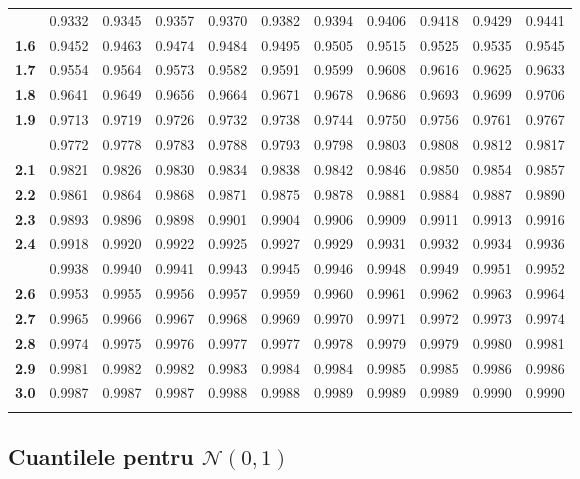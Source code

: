 \documentclass[]{article}
\begin{document}
\begin{longtable}{>{\bfseries}r|rrrrrrrrrr}
\addlinespace
1.5 & 0.9332 & 0.9345 & 0.9357 & 0.9370 & 0.9382 & 0.9394 & 0.9406 & 0.9418 & 0.9429 & 0.9441\\
1.6 & 0.9452 & 0.9463 & 0.9474 & 0.9484 & 0.9495 & 0.9505 & 0.9515 & 0.9525 & 0.9535 & 0.9545\\
1.7 & 0.9554 & 0.9564 & 0.9573 & 0.9582 & 0.9591 & 0.9599 & 0.9608 & 0.9616 & 0.9625 & 0.9633\\
1.8 & 0.9641 & 0.9649 & 0.9656 & 0.9664 & 0.9671 & 0.9678 & 0.9686 & 0.9693 & 0.9699 & 0.9706\\
1.9 & 0.9713 & 0.9719 & 0.9726 & 0.9732 & 0.9738 & 0.9744 & 0.9750 & 0.9756 & 0.9761 & 0.9767\\
\addlinespace
2.0 & 0.9772 & 0.9778 & 0.9783 & 0.9788 & 0.9793 & 0.9798 & 0.9803 & 0.9808 & 0.9812 & 0.9817\\
2.1 & 0.9821 & 0.9826 & 0.9830 & 0.9834 & 0.9838 & 0.9842 & 0.9846 & 0.9850 & 0.9854 & 0.9857\\
2.2 & 0.9861 & 0.9864 & 0.9868 & 0.9871 & 0.9875 & 0.9878 & 0.9881 & 0.9884 & 0.9887 & 0.9890\\
2.3 & 0.9893 & 0.9896 & 0.9898 & 0.9901 & 0.9904 & 0.9906 & 0.9909 & 0.9911 & 0.9913 & 0.9916\\
2.4 & 0.9918 & 0.9920 & 0.9922 & 0.9925 & 0.9927 & 0.9929 & 0.9931 & 0.9932 & 0.9934 & 0.9936\\
\addlinespace
2.5 & 0.9938 & 0.9940 & 0.9941 & 0.9943 & 0.9945 & 0.9946 & 0.9948 & 0.9949 & 0.9951 & 0.9952\\
2.6 & 0.9953 & 0.9955 & 0.9956 & 0.9957 & 0.9959 & 0.9960 & 0.9961 & 0.9962 & 0.9963 & 0.9964\\
2.7 & 0.9965 & 0.9966 & 0.9967 & 0.9968 & 0.9969 & 0.9970 & 0.9971 & 0.9972 & 0.9973 & 0.9974\\
2.8 & 0.9974 & 0.9975 & 0.9976 & 0.9977 & 0.9977 & 0.9978 & 0.9979 & 0.9979 & 0.9980 & 0.9981\\
2.9 & 0.9981 & 0.9982 & 0.9982 & 0.9983 & 0.9984 & 0.9984 & 0.9985 & 0.9985 & 0.9986 & 0.9986\\
3.0 & 0.9987 & 0.9987 & 0.9987 & 0.9988 & 0.9988 & 0.9989 & 0.9989 & 0.9989 & 0.9990 & 0.9990\\*
\end{longtable}

\endgroup{}

\subsection{\texorpdfstring{Cuantilele pentru
\(\mathcal{N}(0,1)\)}{Cuantilele pentru \mathcal\{N\}(0,1)}}\label{cuantilele-pentru-mathcaln01}
\end{document}
